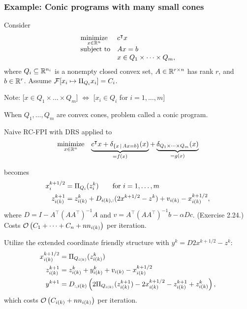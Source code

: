 \documentclass[10pt,mathserif]{beamer}
\begin{document}
\begin{frame}
\frametitle{Example: Conic programs with many small cones}
Consider 
\begin{align*}
\begin{array}{ll}
\underset{x\in\mathbb{R}^n}{\mbox{minimize}} & c^\intercal x \\
\mbox{subject to}& Ax = b\\
  & x\in Q_1\times\dots\times Q_m,
  \end{array}
\end{align*}
where $Q_i\subseteq \mathbb{R}^{n_i}$ is a nonempty closed convex set,
$A\in \mathbb{R}^{r\times n}$ has rank $r$, and $b\in\mathbb{R}^r$.
Assume ${\mathcal{F}}[x_i\mapsto \Pi_{Q_{i}}x_i]=C_i$.
\vspace{0.2in}

Note: [$x\in Q_1\times\dots\times Q_m$] $\Leftrightarrow$ [$x_i\in Q_i$ for $i=1,\dots,m$]
\vspace{0.2in}

When $Q_1,\dots,Q_m$ are convex cones, problem called a conic program.

\end{frame}

\begin{frame}
Naive RC-FPI with DRS applied to 
\begin{align*}
\begin{array}{ll}
\underset{x\in\mathbb{R}^n}{\mbox{minimize}} & 
\underbrace{c^\intercal x + \delta_{\{x\,|\,Ax=b\}}(x)}_{=f(x)}+
\underbrace{\delta_{ Q_1\times\dots\times Q_m}(x)}_{=g(x)}
  \end{array}
\end{align*}
\vspace{-0.3in}

becomes
\begin{align*}
    x^{k+1/2}_{i}&=\Pi_{Q_{i}}(z^k_{i})\qquad\text{for }i=1,\dots,m\\
    z^{k+1}_{i(k)}&=z^k_{i(k)}+D_{i(k),:}(2x^{k+1/2}-z^k)+v_{i(k)}-x^{k+1/2}_{i(k)},\end{align*}
where $D=I-A^\intercal(AA^\intercal)^{-1}A$ and $v=A^\intercal(AA^\intercal)^{-1}b-\alpha Dc$.
(Exercise 2.24.)
Costs ${\mathcal{O}\left(C_1+\dots+C_n+nn_{i(k)}\right)}$ per iteration.

\end{frame}

\begin{frame}

Utilize the extended coordinate friendly structure with $y^k=D2x^{k+1/2}-z^k$:
\begin{align*}
    x^{k+1/2}_{i(k)}&=\Pi_{Q_{i(k)}}(z^k_{i(k)})\\
    z^{k+1}_{i(k)}&=z^k_{i(k)}+y^k_{i(k)}+v_{i(k)}-x^{k+1/2}_{i(k)}\\
     y^{k+1}&=D_{:,i(k)}\left(2\Pi_{Q_{i(k)}}(z^{k+1}_{i(k)})-2x^{k+1/2}_{i(k)}-z^{k+1}_{i(k)}+z^{k}_{i(k)}\right),
\end{align*}
which costs ${\mathcal{O}\left(C_{i(k)}+nn_{i(k)}\right)}$ per iteration.
\end{frame}
\end{document}

